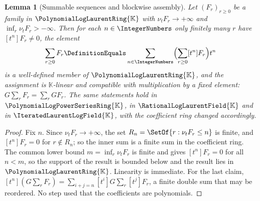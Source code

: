 \documentclass[11pt,oneside]{article}
\theoremstyle{plain}
\newtheorem{lemma}[theorem]{Lemma}
\theoremstyle{definition}
\theoremstyle{remark}
\newcommand{\K}{\mathbb{K}}
\newcommand{\PLpow}{\PolynomialLogPowerSeriesRing{\K}}   %
\newcommand{\PLlau}{\PolynomialLogLaurentRing{\K}}       %
\newcommand{\PLrat}{\RationalLogLaurentField{\K}}        %
\newcommand{\PLit}{\IteratedLaurentLogField{\K}}         %
\newcommand{\ordt}{\nu_{t}}                              %
\begin{document}
\begin{lemma}[Summable sequences and blockwise assembly]
\label{plt:lem:dif-summable}
Let \((F_{r})_{r\ge0}\) be a family in \(\PLlau\) with
\(\ordt F_{r}\to+\infty\) and \(\inf_{r}\ordt F_{r}>-\infty\).  Then for each
\(n\in\IntegerNumbers\) only finitely many \(r\) have \([t^{n}]F_{r}\ne0\), the
element
\[
  \sum_{r\ge0}F_{r}\DefinitionEquals
  \sum_{n\in\IntegerNumbers}\Bigl(\sum_{r\ge0}[t^{n}]F_{r}\Bigr)t^{n}
\]
is a well-defined member of \(\PLlau\), and the assignment is
\(\K\)-linear and compatible with multiplication by a fixed element:
\(G\sum_{r}F_{r}=\sum_{r}GF_{r}\).  The same statements hold in \(\PLpow\),
in \(\PLrat\) and in \(\PLit\), with the coefficient ring changed accordingly.
\end{lemma}

\begin{proof}
Fix \(n\).  Since \(\ordt F_{r}\to+\infty\), the set \(R_{n}=\SetOf{r:\ordt
F_{r}\le n}\) is finite, and \([t^{n}]F_{r}=0\) for \(r\notin R_{n}\); so the
inner sum is a finite sum in the coefficient ring.  The common lower bound
\(m=\inf_{r}\ordt F_{r}\) is finite and gives \([t^{n}]F_{r}=0\) for all
\(n<m\), so the support of the result is bounded below and the result lies in
\(\PLlau\).  Linearity is immediate.  For the last claim,
\([t^{n}](G\sum_{r}F_{r})=\sum_{i+j=n}[t^{i}]G\sum_{r}[t^{j}]F_{r}\), a finite
double sum that may be reordered.  No step used that the coefficients are
polynomials.
\end{proof}
\end{document}
